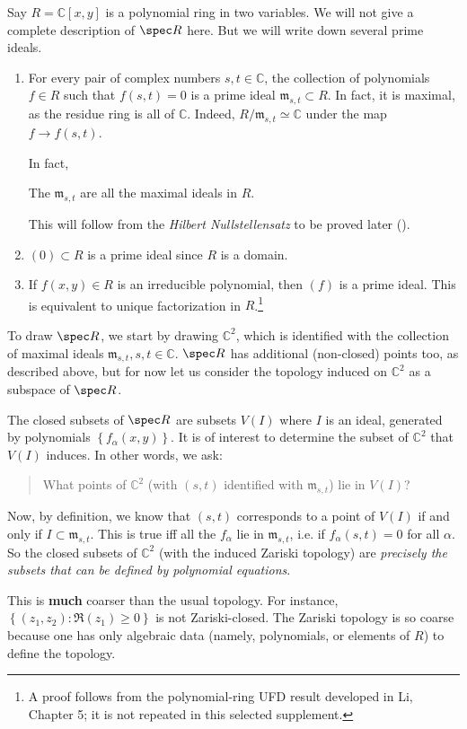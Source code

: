 \begin{example} \label{twovarpoly}
Say $R = \mathbb{C}[x,y]$ is a polynomial ring in two variables.
We will not give a complete description of $\spec R$ here. But we will write
down several
prime ideals.

\begin{enumerate}
\item For every pair of complex numbers $s,t \in \mathbb{C}$,
the collection of polynomials
$f \in R$ such that $f(s,t) = 0$ is a prime ideal $\mathfrak{m}
_{s,t} \subset R$. In
fact, it is maximal, as the residue ring is all of
$\mathbb{C}$. Indeed,
$R/\mathfrak{m}_{s,t} \simeq \mathbb{C}$ under the map $f \to
f(s,t)$.

In fact, 
\begin{theorem}
The $\mathfrak{m}_{s,t}$ are all the maximal ideals in $R$.
\end{theorem} 
This will follow from the \emph{Hilbert Nullstellensatz} to be
proved later
().
\item $(0) \subset R$ is a prime ideal since $R$ is a domain. 
\item If $f(x,y) \in R$ is an irreducible polynomial, then $(f)$
is a prime
ideal. This is equivalent to unique factorization in
$R$.\footnote{A proof follows from the polynomial-ring UFD result developed in Li, Chapter 5; it is not repeated in this selected supplement.}  
\end{enumerate}

To draw $\spec R$, we start by drawing $\mathbb{C}^2$, which is identified
with the
collection of
maximal ideals $\mathfrak{m}_{s,t}, s, t \in \mathbb{C}$. $\spec R$ has
additional (non-closed) points
too, as
described above, but for now let us
consider the topology induced on $\mathbb{C}^2$ as a subspace of
$\spec R$.

The closed subsets of $\spec R$ are subsets $V(I)$ where $I$ is
an ideal,
generated by polynomials $\left\{f_{\alpha}(x,y)\right\}$. It is of interest to
determine the subset of $\mathbb{C}^2$ that
$V(I)$
induces. In other words, we ask:
\begin{quote}
What points of $\mathbb{C}^2$ (with $(s,t)$ identified with
$\mathfrak{m}_{s,t}$) lie in $V(I)$?
\end{quote}
Now, by definition, we know that $(s,t)$ corresponds to a point of $V(I)$ if
and only if $I
\subset \mathfrak{m}_{s,t}$.
This is true iff all the
$f_{\alpha} $ lie in $ \mathfrak{m}_{s,t}$, i.e. if
$f_{\alpha}(s,t) =0$ for all
$\alpha$. So the closed subsets of $\mathbb{C}^2$ (with the
induced Zariski
topology) are \emph{precisely the subsets
that can be defined by polynomial equations}.

This is
\textbf{much} coarser
than the usual topology. For instance, $\left\{(z_1,z_2):
\Re(z_1) \geq 0\right\}$ is
not Zariski-closed. 
The Zariski topology is so coarse because one has only algebraic
data (namely,
polynomials, or elements of $R$) to define the topology.
\end{example} 

